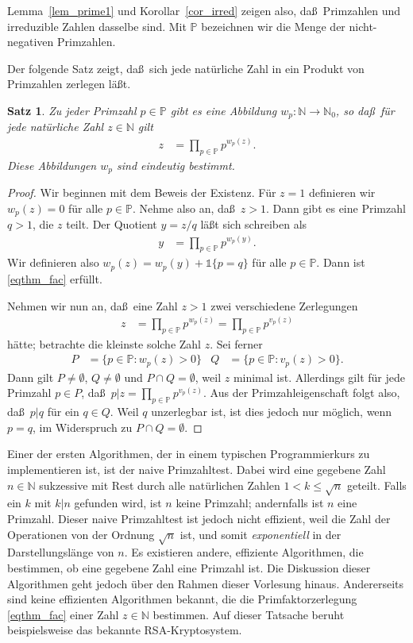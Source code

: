 \documentclass[10pt,reqno]{amsart}
\numberwithin{equation}{section}
\newcommand\NN{\mathbb N}
\newcommand\PP{\mathbb P}
\newtheorem{theorem}[definition]{Satz}
\newcommand{\vecone}{\mathbb{1}}
\newcommand\Lem{Lemma}
\newcommand\Cor{Korollar}
\begin{document}
\Lem~\ref{lem_prime1} und \Cor~\ref{cor_irred} zeigen also, da\ss\ Primzahlen und irreduzible Zahlen dasselbe sind.
Mit $\PP$ bezeichnen wir die Menge der nicht-negativen Primzahlen.

Der folgende Satz zeigt, da\ss\ sich jede nat\"urliche Zahl in ein Produkt von Primzahlen zerlegen l\"a\ss t.

\begin{theorem}\label{thm_fac}
	Zu jeder Primzahl $p\in\PP$ gibt es eine Abbildung $w_p:\NN\to\NN_0$, so da\ss\ f\"ur jede nat\"urliche Zahl $z\in\NN$ gilt
	\begin{align}\label{eqthm_fac}
		z&=\prod_{p\in\PP}p^{w_p(z)}.
	\end{align}
	Diese Abbildungen $w_p$ sind eindeutig bestimmt.
\end{theorem}
\begin{proof}
	Wir beginnen mit dem Beweis der Existenz.
	F\"ur $z=1$ definieren wir $w_p(z)=0$ f\"ur alle $p\in\PP$.
	Nehme also an, da\ss\ $z>1$.
	Dann gibt es eine Primzahl $q>1$, die $z$ teilt.
	Der Quotient $y=z/q$ l\"a\ss t sich schreiben als
	\begin{align*}
		y&=\prod_{p\in\PP}p^{w_p(y)}.
	\end{align*}
	Wir definieren also $w_p(z)=w_p(y)+\vecone\{p=q\}$ f\"ur alle $p\in\PP$.
	Dann ist \eqref{eqthm_fac} erf\"ullt.

	Nehmen wir nun an, da\ss\ eine Zahl $z>1$ zwei verschiedene Zerlegungen
	\begin{align*}
		z&=\prod_{p\in\PP}p^{w_p(z)}=\prod_{p\in\PP}p^{v_p(z)}
	\end{align*}
	h\"atte; betrachte die kleinste solche Zahl $z$.
	Sei ferner
	\begin{align*}
		P&=\{p\in\PP:w_p(z)>0\}&Q&=\{p\in\PP:v_p(z)>0\}.
	\end{align*}
	Dann gilt $P\neq\emptyset$, $Q\neq\emptyset$ und $P\cap Q=\emptyset$, weil $z$ minimal ist.
	Allerdings gilt f\"ur jede Primzahl $p\in P$, da\ss\ $p|z=\prod_{p\in\PP}p^{v_p(z)}$.
	Aus der Primzahleigenschaft folgt also, da\ss\ $p|q$ f\"ur ein $q\in Q$.
	Weil $q$ unzerlegbar ist, ist dies jedoch nur m\"oglich, wenn $p=q$, im Widerspruch zu $P\cap Q=\emptyset$.
\end{proof}

Einer der ersten Algorithmen, der in einem typischen Programmierkurs zu implementieren ist, ist der naive Primzahltest.
Dabei wird eine gegebene Zahl $n\in\NN$ sukzessive mit Rest durch alle nat\"urlichen Zahlen $1<k\leq\sqrt n$ geteilt.
Falls ein $k$ mit $k|n$ gefunden wird, ist $n$ keine Primzahl; andernfalls ist $n$ eine Primzahl.
Dieser naive Primzahltest ist jedoch nicht effizient, weil die Zahl der Operationen von der Ordnung $\sqrt n$ ist, und somit {\em exponentiell} in der Darstellungsl\"ange von $n$.
Es existieren andere, effiziente Algorithmen, die bestimmen, ob eine gegebene Zahl eine Primzahl ist.
Die Diskussion dieser Algorithmen geht jedoch \"uber den Rahmen dieser Vorlesung hinaus.
Andererseits sind keine effizienten Algorithmen bekannt, die die Primfaktorzerlegung \eqref{eqthm_fac} einer Zahl $z\in\NN$ bestimmen.
Auf dieser Tatsache beruht beispielsweise das bekannte RSA-Kryptosystem.
\end{document}
